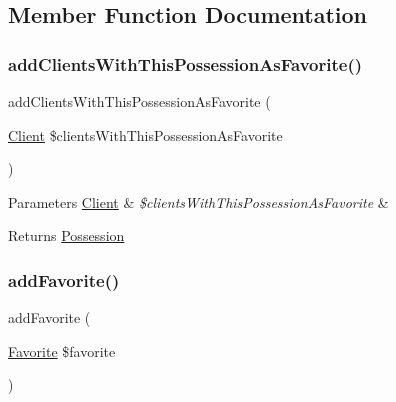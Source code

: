 \subsection{Member Function Documentation}
\mbox{\label{class_app_1_1_entity_1_1_possession_ad925b126642a522cf7c80df736818fb0}} 
\subsubsection{\texorpdfstring{addClientsWithThisPossessionAsFavorite()}{addClientsWithThisPossessionAsFavorite()}}
{\footnotesize\ttfamily add\+Clients\+With\+This\+Possession\+As\+Favorite (\begin{DoxyParamCaption}\item[{\mbox{\hyperlink{class_app_1_1_entity_1_1_client}{Client}}}]{\$clients\+With\+This\+Possession\+As\+Favorite }\end{DoxyParamCaption})}


\begin{DoxyParams}[1]{Parameters}
\mbox{\hyperlink{class_app_1_1_entity_1_1_client}{Client}} & {\em \$clients\+With\+This\+Possession\+As\+Favorite} & \\
\hline
\end{DoxyParams}
\begin{DoxyReturn}{Returns}
\mbox{\hyperlink{class_app_1_1_entity_1_1_possession}{Possession}} 
\end{DoxyReturn}
\mbox{\label{class_app_1_1_entity_1_1_possession_a615e5ec7b500b8e4ccfb8a2c32d9f8e8}} 
\subsubsection{\texorpdfstring{addFavorite()}{addFavorite()}}
{\footnotesize\ttfamily add\+Favorite (\begin{DoxyParamCaption}\item[{\mbox{\hyperlink{class_app_1_1_entity_1_1_favorite}{Favorite}}}]{\$favorite }\end{DoxyParamCaption})}


